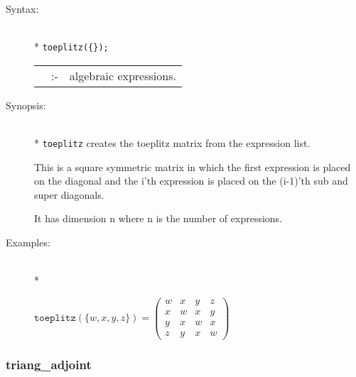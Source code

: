 \begin{description}
\item[Syntax:]\mbox{}\\*
\texttt{toeplitz(\{\exprlist{}\});} \lazyfootnote{}\\[2mm]
\begin{tabular}{l l l}
\exprlist{} &:-& algebraic expressions.
\end{tabular}

\item[Synopsis:]\mbox{}\\*
\texttt{toeplitz} creates the toeplitz matrix from the 
                expression list. 

This is a square symmetric matrix in 
                which the first expression is placed on the diagonal 
                and the i'th expression is placed on the (i-1)'th sub 
                and super diagonals.

It has dimension n where n is the 
                number of expressions.

\item[Examples:]\mbox{}\\*
\begin{flushleft}  
\begin{math}  
\texttt{toeplitz}(\{w,x,y,z\}) =
        \begin{pmatrix} w & x & y & z \\ x & w & x & y \\
      y & x & w & x \\ z & y & x & w
\end{pmatrix}
\end{math}  
\end{flushleft}
\end{description}

\subsubsection{triang\_adjoint}
\label{linalg:triang_adjoint}


